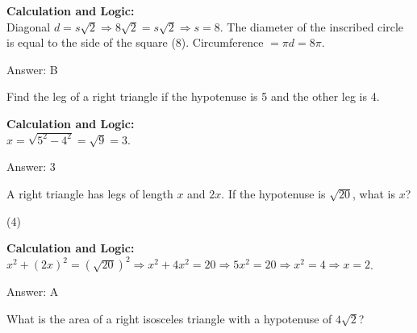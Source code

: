 \documentclass[11pt,paper=a4,answers]{exam}
\begin{document}
\begin{questions}
\begin{solution}
\textbf{Calculation and Logic:} \\
Diagonal $d = s\sqrt{2} \Rightarrow 8\sqrt{2} = s\sqrt{2} \Rightarrow s = 8$. The diameter of the inscribed circle is equal to the side of the square (8). Circumference $= \pi d = 8\pi$.

\vspace{30pt}

Answer: \colorbox{yellow!100}{B}
\end{solution}

\vspace{60pt}

\question
Find the leg of a right triangle if the hypotenuse is 5 and the other leg is 4.

\begin{solution}
\textbf{Calculation and Logic:} \\
$x = \sqrt{5^2 - 4^2} = \sqrt{9} = 3$.

\vspace{30pt}

Answer: \colorbox{yellow!100}{3}
\end{solution}

\vspace{60pt}

\question
A right triangle has legs of length $x$ and $2x$. If the hypotenuse is $\sqrt{20}$, what is $x$?
\begin{tasks}(4)
\end{tasks}

\begin{solution}
\textbf{Calculation and Logic:} \\
$x^2 + (2x)^2 = (\sqrt{20})^2 \Rightarrow x^2 + 4x^2 = 20 \Rightarrow 5x^2 = 20 \Rightarrow x^2 = 4 \Rightarrow x = 2$.

\vspace{30pt}

Answer: \colorbox{yellow!100}{A}
\end{solution}

\vspace{60pt}

\question
What is the area of a right isosceles triangle with a hypotenuse of $4\sqrt{2}$?


\end{questions}
\end{document}
